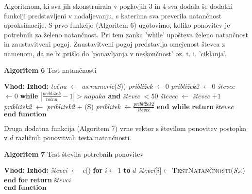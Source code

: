 \documentclass[12pt,a4paper]{amsart}
\theoremstyle{definition} %
\theoremstyle{plain} %
\begin{document}
Algoritmom, ki sva jih skonstruirala v poglavjih 3 in 4 sva dodala še dodatni funkciji predstavljeni v nadaljevanju, s katerima sva preverila natančnost aproksimacije. S prvo funkcijo (Algoritem 6) ugotovimo, koliko ponovitev je potrebnih za želeno natančnost. Pri tem zanka 'while' upošteva želeno natančnost in zaustavitveni pogoj. Zaustavitveni pogoj predstavlja omejenost števca z namenom, da ne bi prišlo do 'ponavljanja v neskončnost' oz. t. i. 'ciklanja'. 

\begin{algorithm}[H]
\caption{\textbf{Algoritem 6} Test natančnosti}\label{natančnost}
\begin{algorithmic}[1]
\Statex\textbf{Vhod:} 
\Statex\textbf{Izhod:} 
\State \textit{točna} $\gets$ \textit{as.numeric}(\textit{S})) 
\State \textit{približek} $\gets 0$ 
\State \textit{približek2} $\gets 0$ 
\State \textit{števec} $\gets 0$ 
\State \textbf{while} {$|\frac{\textit{približek}}{\textit{točna}} - 1| > \textit{napaka}$ \textbf{and} \textit{števec} $< 50$}
	\State \hspace{6mm} \textit{števec} $\gets$ \textit{števec} $+ 1$ 
	\State \hspace{6mm} \textit{približek2} $\gets$ \textit{približek2} + (S) 
	\State \hspace{6mm} \textit{približek} $\gets \frac{\textit{približek2}}{\textit{števec}}$ 
\State \textbf{end while}
\State \textbf{return} $\textit{števec}$ \\
$\textbf{end function}$
\EndFunction
\end{algorithmic}
\end{algorithm}

Druga dodatna funkcija (Algoritem 7) vrne vektor s številom ponovitev postopka v $d$ različnih ponovitvah testa natančnosti.

\begin{algorithm}[H]
\caption{\textbf{Algoritem 7} Test števila potrebnih ponovitev}\label{ponovitve}
\begin{algorithmic}[1]
\Statex\textbf{Vhod:} 
\Statex\textbf{Izhod:} 
\State \textit{števci} $\gets$ \textit{c}(\hspace{1mm})
\State \textbf{for} {$\textit{i} \gets 1$ \textbf{to} $d$}
		\State \hspace{6mm} $\textit{števci}[i] \gets \textproc{TestNatančnosti}(\textit{S,$\varepsilon$})$
\State $\textbf{end for}$
\State \textbf{return} $\textit{števci}$ \\
$\textbf{end function}$
\EndFunction
\end{algorithmic}
\end{algorithm}
\end{document}
